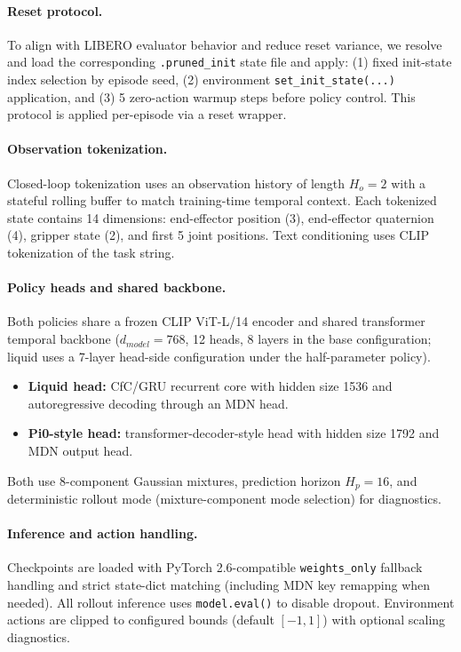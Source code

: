 \documentclass{article}
\begin{document}
\paragraph{Reset protocol.}
To align with LIBERO evaluator behavior and reduce reset variance, we resolve and load the corresponding \texttt{.pruned\_init} state file and apply: (1) fixed init-state index selection by episode seed, (2) environment \texttt{set\_init\_state(...)} application, and (3) 5 zero-action warmup steps before policy control. This protocol is applied per-episode via a reset wrapper.

\paragraph{Observation tokenization.}
Closed-loop tokenization uses an observation history of length $H_o=2$ with a stateful rolling buffer to match training-time temporal context. Each tokenized state contains 14 dimensions: end-effector position (3), end-effector quaternion (4), gripper state (2), and first 5 joint positions. Text conditioning uses CLIP tokenization of the task string.

\paragraph{Policy heads and shared backbone.}
Both policies share a frozen CLIP ViT-L/14 encoder and shared transformer temporal backbone ($d_{model}=768$, 12 heads, 8 layers in the base configuration; liquid uses a 7-layer head-side configuration under the half-parameter policy).
\begin{itemize}
    \item \textbf{Liquid head:} CfC/GRU recurrent core with hidden size 1536 and autoregressive decoding through an MDN head.
    \item \textbf{Pi0-style head:} transformer-decoder-style head with hidden size 1792 and MDN output head.
\end{itemize}
Both use 8-component Gaussian mixtures, prediction horizon $H_p=16$, and deterministic rollout mode (mixture-component mode selection) for diagnostics.

\paragraph{Inference and action handling.}
Checkpoints are loaded with PyTorch 2.6-compatible \texttt{weights\_only} fallback handling and strict state-dict matching (including MDN key remapping when needed). All rollout inference uses \texttt{model.eval()} to disable dropout. Environment actions are clipped to configured bounds (default $[-1,1]$) with optional scaling diagnostics.
\end{document}
